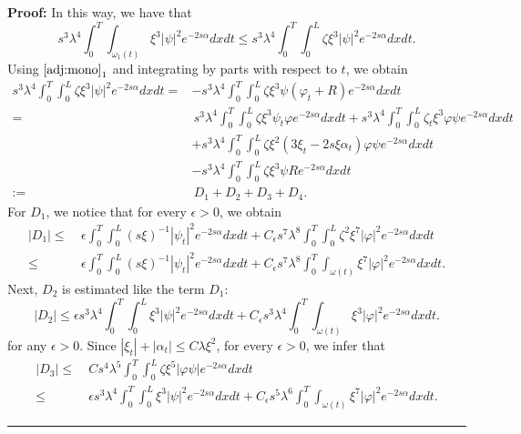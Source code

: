 \documentclass[10pt]{article}
\newenvironment{proof}[1][Proof]
{\noindent\textbf{#1:} }{\hfill\rule{0.5em}{0.5em}}
\def\om{\omega}
\def\\Phivec{\mathbf{\Phi}}
\newcommand{\iiTL}{\int_0^T\!\!\!\!\int_0^L }
\begin{document}
\begin{proof}
	In this way, we have that
\begin{equation}\label{eq:cut-offBZK}
	s^3 \lambda ^4\int_0^T \!\!\! \int_{\om_1(t)}\xi ^3 |\psi|^2 e^{-2s\alpha} dxdt
	\leq s^3\lambda ^4\iiTL\zeta \xi ^3 |\psi|^2 e^{-2s\alpha} dxdt .
\end{equation}
	Using $ \eqref{adj:mono}_1$ and integrating by parts with respect to  $t$, we obtain
\begin{align*}
	s^3\lambda ^4\iiTL\zeta \xi ^3 |\psi|^2 e^{-2s\alpha} dxdt
	=& -s^3\lambda ^4 \iiTL \zeta\xi ^3\psi(\varphi_t+R) e^{-2s\alpha}  dxdt\\
	=& \,s^3\lambda ^4 \iiTL\zeta\xi^3  \psi_t\varphi e^{-2s\alpha}  dxdt
	 +  s^3\lambda ^4\iiTL \zeta_t\xi ^3\varphi\psi e^{-2s\alpha}  dxdt  \\
	&+s^3\lambda ^4 \iiTL\zeta\xi^2(3\xi_t - 2 s\xi\alpha_t) \varphi\psi e^{-2s\alpha}  dxdt\\
	& -s^3\lambda ^4 \iiTL \zeta\xi ^3\psi R e^{-2s\alpha}  dxdt\\
   	:=&\,D_1+D_2+D_3+D_4.
\end{align*}
	For $D_1$, we notice that for every $\epsilon >0$, we obtain
\begin{equation}\label{est:A21}
	\begin{alignedat}{2}
		|D_1| \le&~ \epsilon  \iiTL(s\xi)^{-1}  |\psi_t|^2 e^{-2s\alpha} dxdt
		+C_{\epsilon}s^7\lambda^8 \iiTL \zeta^2\xi^7  |\varphi|^2
		e^{-2s\alpha}  dxdt\\
		\le&~ \epsilon  \iiTL(s\xi)^{-1}  |\psi_t|^2 e^{-2s\alpha} dxdt
		+C_{\epsilon}s^7\lambda^8 \int_0^T \!\!\! \int_{\om(t)}\xi^7  |\varphi|^2
		e^{-2s\alpha}  dxdt.
	\end{alignedat}
\end{equation}
	Next, $D_2$ is estimated like the term $D_1$:
\begin{equation}\label{est:A23}
	|D_2| \leq \epsilon s^3\lambda^4  \iiTL \xi ^3 |\psi|^2  e^{-2s\alpha} dxdt
	+ C_{\epsilon} s^3\lambda^4 \int_0^T \!\!\! \int_{\om(t)}\xi ^3 |\varphi|^2 e^{-2s\alpha} dxdt.
\end{equation}
	for any $\epsilon >0$.
	Since $|\xi_t| +|\alpha_t| \leq C \lambda\xi  ^2$, for every $\epsilon >0$, we infer that
\begin{equation}\label{est:A22}
	\begin{alignedat}{2}
	|D_3| \le&~  Cs^4\lambda^5 \iiTL \zeta    \xi^5  |\varphi\psi| e^{-2s\alpha} dxdt \nonumber  \\
	\le&~\epsilon s^3\lambda^4\iiTL\xi ^{3}|\psi|^2 e^{-2s\alpha} dxdt
	+C_\epsilon s^5\lambda^6\int_0^T \!\!\! \int_{\om(t)} \xi ^7  |\varphi|^2e^{-2s\alpha}  dxdt .

\end{alignedat}
\end{equation}
\end{proof}
\end{document}
